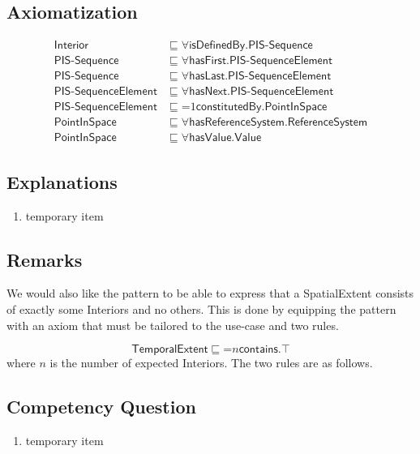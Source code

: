 \subsection{Axiomatization}
\label{axs:Spatial}
\begin{align}
\textsf{Interior} &\sqsubseteq \forall \textsf{isDefinedBy.PIS-Sequence} \\
\textsf{PIS-Sequence} &\sqsubseteq \forall \textsf{hasFirst.PIS-SequenceElement} \\
\textsf{PIS-Sequence} &\sqsubseteq \forall \textsf{hasLast.PIS-SequenceElement} \\
\textsf{PIS-SequenceElement} &\sqsubseteq \forall \textsf{hasNext.PIS-SequenceElement} \\
\textsf{PIS-SequenceElement} &\sqsubseteq \mathord{=}1 \textsf{constitutedBy.PointInSpace} \\
\textsf{PointInSpace} &\sqsubseteq \forall \textsf{hasReferenceSystem.ReferenceSystem} \\
\textsf{PointInSpace} &\sqsubseteq \forall \textsf{hasValue.Value}
\end{align}

\subsection{Explanations}
\label{exp:Spatial}
\begin{enumerate}
\item temporary item
\end{enumerate}

\subsection{Remarks}
\label{rem:Spatial}
We would also like the pattern to be able to express that a \textsf{SpatialExtent} consists of exactly some \textsf{Interiors} and no others. This is done by equipping the pattern with an axiom that must be tailored to the use-case and two rules.

\begin{equation}
\textsf{TemporalExtent} \sqsubseteq \mathord{=}n\textsf{contains.}\top
\end{equation}
where $n$ is the number of expected \textsf{Interiors}. The two rules are as follows.

\subsection{Competency Question}
\label{cqs:Spatial}
\begin{enumerate}[CQ1.]
\item temporary item
\end{enumerate}

\newpage
